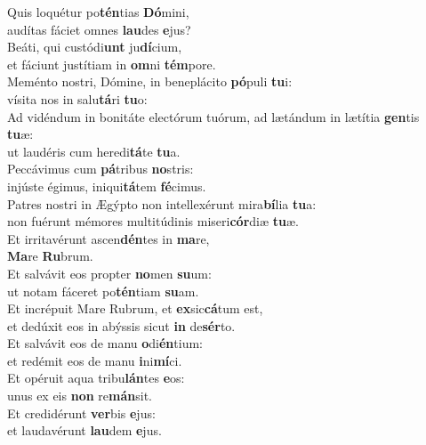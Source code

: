 \evenverse Quis loquétur po\textbf{tén}tias \textbf{Dó}mini,~\*\\
\evenverse audítas fáciet omnes \textbf{lau}des \textbf{e}jus?\\
\oddverse Beáti, qui custódi\textbf{unt} ju\textbf{dí}cium,~\*\\
\oddverse et fáciunt justítiam in \textbf{om}ni \textbf{tém}pore.\\
\evenverse Meménto nostri, Dómine, in beneplácito \textbf{pó}puli \textbf{tu}i:~\*\\
\evenverse vísita nos in salu\textbf{tá}ri \textbf{tu}o:\\
\oddverse Ad vidéndum in bonitáte electórum tuórum, ad lætándum in lætítia \textbf{gen}tis \textbf{tu}æ:~\*\\
\oddverse ut laudéris cum heredi\textbf{tá}te \textbf{tu}a.\\
\evenverse Peccávimus cum \textbf{pá}tribus \textbf{no}stris:~\*\\
\evenverse injúste égimus, iniqui\textbf{tá}tem \textbf{fé}cimus.\\
\oddverse Patres nostri in Ægýpto non intellexérunt mira\textbf{bí}lia \textbf{tu}a:~\*\\
\oddverse non fuérunt mémores multitúdinis miseri\textbf{cór}diæ \textbf{tu}æ.\\
\evenverse Et irritavérunt ascen\textbf{dén}tes in \textbf{ma}re,~\*\\
\evenverse \textbf{Ma}re \textbf{Ru}brum.\\
\oddverse Et salvávit eos propter \textbf{no}men \textbf{su}um:~\*\\
\oddverse ut notam fáceret po\textbf{tén}tiam \textbf{su}am.\\
\evenverse Et incrépuit Mare Rubrum, et \textbf{ex}sic\textbf{cá}tum est,~\*\\
\evenverse et dedúxit eos in abýssis sicut \textbf{in} de\textbf{sér}to.\\
\oddverse Et salvávit eos de manu \textbf{o}di\textbf{én}tium:~\*\\
\oddverse et redémit eos de manu \textbf{i}ni\textbf{mí}ci.\\
\evenverse Et opéruit aqua tribu\textbf{lán}tes \textbf{e}os:~\*\\
\evenverse unus ex eis \textbf{non} re\textbf{mán}sit.\\
\oddverse Et credidérunt \textbf{ver}bis \textbf{e}jus:~\*\\
\oddverse et laudavérunt \textbf{lau}dem \textbf{e}jus.\\
